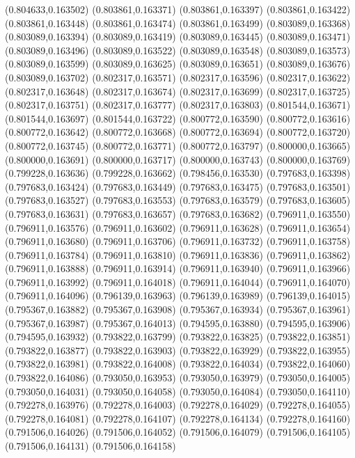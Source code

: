 (0.804633,0.163502)
(0.803861,0.163371)
(0.803861,0.163397)
(0.803861,0.163422)
(0.803861,0.163448)
(0.803861,0.163474)
(0.803861,0.163499)
(0.803089,0.163368)
(0.803089,0.163394)
(0.803089,0.163419)
(0.803089,0.163445)
(0.803089,0.163471)
(0.803089,0.163496)
(0.803089,0.163522)
(0.803089,0.163548)
(0.803089,0.163573)
(0.803089,0.163599)
(0.803089,0.163625)
(0.803089,0.163651)
(0.803089,0.163676)
(0.803089,0.163702)
(0.802317,0.163571)
(0.802317,0.163596)
(0.802317,0.163622)
(0.802317,0.163648)
(0.802317,0.163674)
(0.802317,0.163699)
(0.802317,0.163725)
(0.802317,0.163751)
(0.802317,0.163777)
(0.802317,0.163803)
(0.801544,0.163671)
(0.801544,0.163697)
(0.801544,0.163722)
(0.800772,0.163590)
(0.800772,0.163616)
(0.800772,0.163642)
(0.800772,0.163668)
(0.800772,0.163694)
(0.800772,0.163720)
(0.800772,0.163745)
(0.800772,0.163771)
(0.800772,0.163797)
(0.800000,0.163665)
(0.800000,0.163691)
(0.800000,0.163717)
(0.800000,0.163743)
(0.800000,0.163769)
(0.799228,0.163636)
(0.799228,0.163662)
(0.798456,0.163530)
(0.797683,0.163398)
(0.797683,0.163424)
(0.797683,0.163449)
(0.797683,0.163475)
(0.797683,0.163501)
(0.797683,0.163527)
(0.797683,0.163553)
(0.797683,0.163579)
(0.797683,0.163605)
(0.797683,0.163631)
(0.797683,0.163657)
(0.797683,0.163682)
(0.796911,0.163550)
(0.796911,0.163576)
(0.796911,0.163602)
(0.796911,0.163628)
(0.796911,0.163654)
(0.796911,0.163680)
(0.796911,0.163706)
(0.796911,0.163732)
(0.796911,0.163758)
(0.796911,0.163784)
(0.796911,0.163810)
(0.796911,0.163836)
(0.796911,0.163862)
(0.796911,0.163888)
(0.796911,0.163914)
(0.796911,0.163940)
(0.796911,0.163966)
(0.796911,0.163992)
(0.796911,0.164018)
(0.796911,0.164044)
(0.796911,0.164070)
(0.796911,0.164096)
(0.796139,0.163963)
(0.796139,0.163989)
(0.796139,0.164015)
(0.795367,0.163882)
(0.795367,0.163908)
(0.795367,0.163934)
(0.795367,0.163961)
(0.795367,0.163987)
(0.795367,0.164013)
(0.794595,0.163880)
(0.794595,0.163906)
(0.794595,0.163932)
(0.793822,0.163799)
(0.793822,0.163825)
(0.793822,0.163851)
(0.793822,0.163877)
(0.793822,0.163903)
(0.793822,0.163929)
(0.793822,0.163955)
(0.793822,0.163981)
(0.793822,0.164008)
(0.793822,0.164034)
(0.793822,0.164060)
(0.793822,0.164086)
(0.793050,0.163953)
(0.793050,0.163979)
(0.793050,0.164005)
(0.793050,0.164031)
(0.793050,0.164058)
(0.793050,0.164084)
(0.793050,0.164110)
(0.792278,0.163976)
(0.792278,0.164003)
(0.792278,0.164029)
(0.792278,0.164055)
(0.792278,0.164081)
(0.792278,0.164107)
(0.792278,0.164134)
(0.792278,0.164160)
(0.791506,0.164026)
(0.791506,0.164052)
(0.791506,0.164079)
(0.791506,0.164105)
(0.791506,0.164131)
(0.791506,0.164158)
